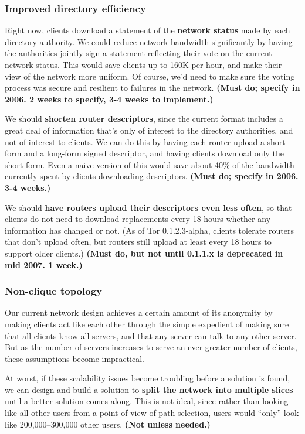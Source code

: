 \documentclass{article}
\newcommand{\plan}[1]{ {\bf (#1)}}
\begin{document}
\subsubsection{Improved directory efficiency}
Right now, clients download a statement of the {\bf network status} made by
each directory authority.  We could reduce network bandwidth significantly by
having the authorities jointly sign a statement reflecting their vote on the
current network status.  This would save clients up to 160K per hour, and
make their view of the network more uniform.  Of course, we'd need to make
sure the voting process was secure and resilient to failures in the
network.\plan{Must do; specify in 2006. 2 weeks to specify, 3-4 weeks to
  implement.}

We should {\bf shorten router descriptors}, since the current format includes
a great deal of information that's only of interest to the directory
authorities, and not of interest to clients.  We can do this by having each
router upload a short-form and a long-form signed descriptor, and having
clients download only the short form.  Even a naive version of this would
save about 40\% of the bandwidth currently spent by clients downloading
descriptors.\plan{Must do; specify in 2006. 3-4 weeks.}

We should {\bf have routers upload their descriptors even less often}, so
that clients do not need to download replacements every 18 hours whether any
information has changed or not.  (As of Tor 0.1.2.3-alpha, clients tolerate
routers that don't upload often, but routers still upload at least every 18
hours to support older clients.) \plan{Must do, but not until 0.1.1.x is
deprecated in mid 2007. 1 week.}

\subsubsection{Non-clique topology}
Our current network design achieves a certain amount of its anonymity by
making clients act like each other through the simple expedient of making
sure that all clients know all servers, and that any server can talk to any
other server.  But as the number of servers increases to serve an
ever-greater number of clients, these assumptions become impractical.

At worst, if these scalability issues become troubling before a solution is
found, we can design and build a solution to {\bf split the network into
multiple slices} until a better solution comes along.  This is not ideal,
since rather than looking like all other users from a point of view of path
selection, users would ``only'' look like 200,000--300,000 other
users.\plan{Not unless needed.}
\end{document}
